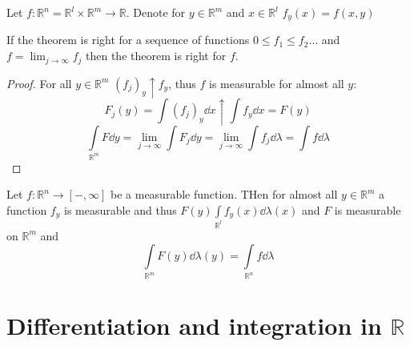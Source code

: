	Let $f: \mathbb{R}^n = \mathbb{R}^l\times \mathbb{R}^m \to \mathbb{R}$. Denote for $y\in \mathbb{R}^m$ and $x\in \mathbb{R}^l$ $f_y(x) = f(x,y)$


\begin{lemma}
	If the theorem is right for a sequence of functions $0\leq f_1 \leq f_2 \dots $ and $f=\lim_{j\to \infty}f_j$ then the theorem is right for $f$.
	\begin{proof}
		For all $y\in \mathbb{R}^m$ $(f_j)_y \uparrow f_y$, thus $f$ is measurable for almost all $y$:
		$$F_j(y) = \int (f_j)_y \dd{x} \uparrow\int f_y \dd{x} = F(y)$$
		$$\int\limits_{\mathbb{R}^m} F \dd{y} = \lim_{j\to \infty} \int F_j \dd{y} = \lim_{j\to \infty} \int f_j \dd{\lambda} = \int f \dd{\lambda}$$
	\end{proof}
\end{lemma}

\begin{theorem}
Let $f: \mathbb{R}^n \to [-,\infty]$ be a measurable function. THen for almost all $y\in \mathbb{R}^m$ a function $f_y$ is measurable and thus $F(y) \int\limits_{\mathbb{R}^l} f_y(x) \dd{\lambda(x)}$ and $F$ is measurable on $\mathbb{R}^m$ and
	$$\int\limits_{\mathbb{R}^m} F(y) \dd{\lambda(y)} = \int\limits_{\mathbb{R}^n} f \dd{\lambda}$$
\end{theorem}


\section{Differentiation and integration in $\mathbb{R}$}
